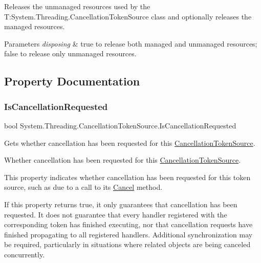 Releases the unmanaged resources used by the T\+:\+System.\+Threading.\+Cancellation\+Token\+Source class and optionally releases the managed resources. 


\begin{DoxyParams}{Parameters}
{\em disposing} & true to release both managed and unmanaged resources; false to release only unmanaged resources.\\
\hline
\end{DoxyParams}


\subsection{Property Documentation}
\mbox{\label{class_system_1_1_threading_1_1_cancellation_token_source_adf148e540b8428fb73479f45bd90ebfc}} 
\subsubsection{\texorpdfstring{Is\+Cancellation\+Requested}{IsCancellationRequested}}
{\footnotesize\ttfamily bool System.\+Threading.\+Cancellation\+Token\+Source.\+Is\+Cancellation\+Requested\hspace{0.3cm}{\ttfamily [get]}}



Gets whether cancellation has been requested for this \hyperlink{}{Cancellation\+Token\+Source}. 

Whether cancellation has been requested for this \hyperlink{}{Cancellation\+Token\+Source}.

This property indicates whether cancellation has been requested for this token source, such as due to a call to its \hyperlink{class_system_1_1_threading_1_1_cancellation_token_source_a1c5aa6f903b7d50df87b7969f9ad10da}{Cancel} method. 

If this property returns true, it only guarantees that cancellation has been requested. It does not guarantee that every handler registered with the corresponding token has finished executing, nor that cancellation requests have finished propagating to all registered handlers. Additional synchronization may be required, particularly in situations where related objects are being canceled concurrently. \mbox{\label{class_system_1_1_threading_1_1_cancellation_token_source_a2ab44a79f438139faf4f7dcce1b3e5b2}} 
